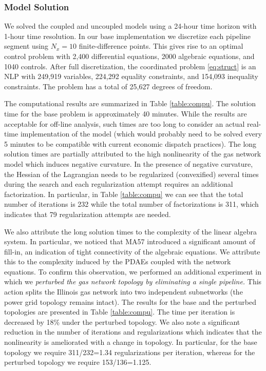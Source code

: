 \documentclass[11pt,twoside]{article}
\begin{document}
\subsubsection{Model Solution}

We solved the coupled and uncoupled models using a 24-hour time horizon with 1-hour time resolution. In our base implementation we discretize each pipeline segment using $N_x=10$ finite-difference points. This gives rise to an optimal control problem with 2,400 differential equations, 2000 algebraic equations, and 1040 controls.  After full discretization, the coordinated problem \eqref{eq:struct} is an NLP with 249,919 variables, 224,292 equality constraints, and 154,093 inequality constraints.  The problem has a total of 25,627 degrees of freedom. 

The computational results are summarized in Table \ref{table:compu}. The solution time for the base problem is approximately 40 minutes.  While the results are acceptable for off-line analysis, such times are too long to consider an actual real-time implementation of the model (which would probably need to be solved every 5 minutes to be compatible with current economic dispatch practices).  The long solution times are partially attributed to the high nonlinearity of the gas network model which induces negative curvature. In the presence of negative curvature, the Hessian of the Lagrangian needs to be regularized (convexified) several times during the search and each regularization attempt requires an additional factorization. In particular, in Table \ref{table:compu} we can see that the total number of iterations is 232 while the total number of factorizations is 311, which indicates that 79 regularization attempts are needed. 

We also attribute the long solution times to the complexity of the linear algebra system. In particular, we noticed that MA57 introduced a significant amount of fill-in, an indication of tight connectivity of the algebraic equations. We attribute this to the complexity induced by the PDAEs coupled with the network equations. To confirm this observation, we performed an additional experiment in which we {\em perturbed the gas network topology by eliminating a single pipeline.} This action splits the Illinois gas network into two independent subnetworks (the power grid topology remains intact). The results for the base and the perturbed topologies are presented in Table \ref{table:compu}. The time per iteration is decreased by 18\% under the perturbed topology.  We also note a significant reduction in the number of iterations and regularizations which indicates that the nonlinearity is ameliorated with a change in topology. In particular, for the base topology we require 311/232=1.34 regularizations per iteration, whereas for the perturbed topology we require 153/136=1.125.  
\end{document}
